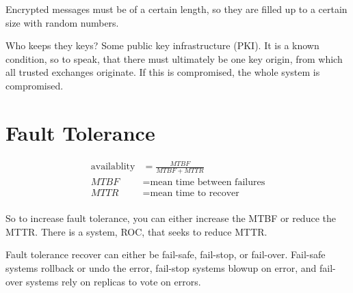 \documentclass[twoside]{article}
\begin{document}
Encrypted messages must be of a certain length, so they are filled up to a
certain size with random numbers.

Who keeps they keys? Some public key infrastructure (PKI). It is a known
condition, so to speak, that there must ultimately be one key origin, from
which all trusted exchanges originate. If this is compromised, the whole
system is compromised.

\section{Fault Tolerance}

\begin{align}
\text{availablity} &= \frac{MTBF}{MTBF + MTTR} \\
MTBF &= \text{mean time between failures} \\
MTTR &= \text{mean time to recover} \\
\end{align}

So to increase fault tolerance, you can either increase the MTBF or reduce the
MTTR. There is a system, ROC, that seeks to reduce MTTR.

Fault tolerance recover can either be fail-safe, fail-stop, or fail-over.
Fail-safe systems rollback or undo the error, fail-stop systems blowup on error,
and fail-over systems rely on replicas to vote on errors.
\end{document}
